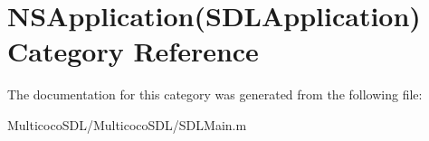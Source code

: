 \hypertarget{category_n_s_application_07_s_d_l_application_08}{\section{N\-S\-Application(S\-D\-L\-Application) Category Reference}
\label{category_n_s_application_07_s_d_l_application_08}
}


The documentation for this category was generated from the following file\-:\begin{DoxyCompactItemize}
\item 
Multicoco\-S\-D\-L/\-Multicoco\-S\-D\-L/S\-D\-L\-Main.\-m\end{DoxyCompactItemize}
